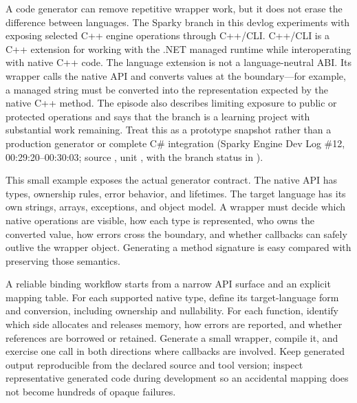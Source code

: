 \hypertarget{01-foundations-i-ch016-a-generated-binding-is-still-an-api-boundary}{}

A code generator can remove repetitive wrapper work, but it does not erase the difference between languages. The Sparky branch in this devlog experiments with exposing selected C++ engine operations through C++/CLI. C++/CLI is a C++ extension for working with the .NET managed runtime while interoperating with native C++ code. The language extension is not a language-neutral ABI. Its wrapper calls the native API and converts values at the boundary---for example, a managed string must be converted into the representation expected by the native C++ method. The episode also describes limiting exposure to public or protected operations and says that the branch is a learning project with substantial work remaining. Treat this as a prototype snapshot rather than a production generator or complete C\# integration (Sparky Engine Dev Log \#12, 00:29:20--00:30:03; source , unit , with the branch status in ).

This small example exposes the actual generator contract. The native API has types, ownership rules, error behavior, and lifetimes. The target language has its own strings, arrays, exceptions, and object model. A wrapper must decide which native operations are visible, how each type is represented, who owns the converted value, how errors cross the boundary, and whether callbacks can safely outlive the wrapper object. Generating a method signature is easy compared with preserving those semantics.

A reliable binding workflow starts from a narrow API surface and an explicit mapping table. For each supported native type, define its target-language form and conversion, including ownership and nullability. For each function, identify which side allocates and releases memory, how errors are reported, and whether references are borrowed or retained. Generate a small wrapper, compile it, and exercise one call in both directions where callbacks are involved. Keep generated output reproducible from the declared source and tool version; inspect representative generated code during development so an accidental mapping does not become hundreds of opaque failures.

